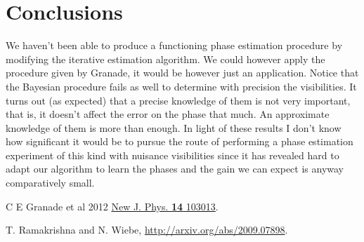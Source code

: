 \documentclass[aps, pra, 10pt, twocolumn, superscriptaddress,floatfix]{revtex4-1}
\begin{document}
\section{Conclusions}
%
We haven't been able to produce a functioning phase estimation procedure by modifying the iterative estimation algorithm. We could however apply the procedure given by Granade, it would be however just an application. Notice that the Bayesian procedure fails as well to determine with precision the visibilities. It turns out (as expected) that a precise knowledge of them is not very important, that is, it doesn't affect the error on the phase that much. An approximate knowledge of them is more than enough. In light of these results I don't know how significant it would be to pursue the route of performing a phase estimation experiment of this kind with nuisance visibilities since it has revealed hard to adapt our algorithm to learn the phases and the gain we can expect is anyway comparatively small.  

\begin{thebibliography}{100}
	
	 C E Granade et al 2012 \href{https://doi.org/10.1088/1367-2630/14/10/103013}{New J. Phys. {\bf 14} 103013}.
	
	 T. Ramakrishna and N. Wiebe, \href{http://arxiv.org/abs/2009.07898}{http://arxiv.org/abs/2009.07898}.
	
\end{thebibliography}
\end{document}
